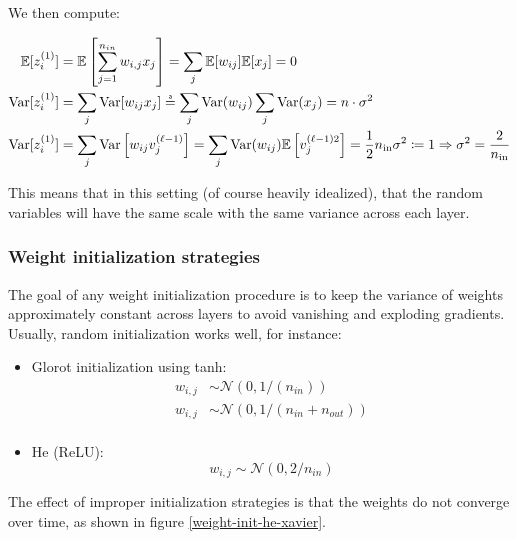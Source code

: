 \documentclass[a4paper,10pt,twoside]{article}
\newcommand\myeq{\mathrel{\overset{\makebox[0pt]{\mbox{\normalfont\tiny\sffamily a}}}{=}}}
\begin{document}
We then compute:

\begin{align*}
    \mathbb{E}[z_i^{(1)}]&=\mathbb{E}\left[\sum_{j=1}^{n_{in}} w_{i,j}x_j\right]=\sum_{j}\mathbb{E}[w_{ij}]\mathbb{E}[x_j]=0\\
    \text{Var}[z_i^{(1)}]&=\sum_{j}\text{Var}[w_{ij}x_j]\myeq\sum_{j}\text{Var}(w_{ij})\sum_{j}\text{Var}(x_{j})=n\cdot \sigma^{2}\\
    \text{Var}[z_i^{(1)}]&=\sum_{j}\text{Var}\left[w_{ij}v_j^{(\ell - 1)}\right] = \sum_{j}\text{Var}(w_{ij})\mathbb{E}\left[v_j^{(\ell -1)2}\right]=\frac{1}{2}n_{\text{in}}\sigma^2\coloneqq 1\Rightarrow\sigma^2=\frac{2}{n_{\text{in}}}      
\end{align*}

This means that in this setting (of course heavily idealized), that the random variables will have the same scale with the same variance across each layer.

\subsubsection{Weight initialization strategies}

The goal of any weight initialization procedure is to keep the variance of weights approximately constant across layers to avoid vanishing and exploding gradients. Usually, random initialization works well, for instance:
\begin{itemize}
    \item Glorot initialization using tanh:
    \begin{align*}
        w_{i,j} &\sim\mathcal{N} (0,1/(n_{in}))\\
        w_{i,j} &\sim\mathcal{N} (0,1/(n_{in}+n_{out}))\\
    \end{align*}
    \item He (ReLU):
    \begin{equation*}
        w_{i,j}\sim\mathcal{N}(0,2/n_{in})
    \end{equation*}
\end{itemize}

The effect of improper initialization strategies is that the weights do not converge over time, as shown in figure \ref{weight-init-he-xavier}.
\end{document}
